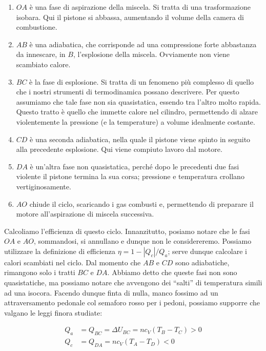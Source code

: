 \begin{enumerate}
    \item $OA$ è una fase di aspirazione della miscela. Si
    tratta di una trasformazione isobara. Qui il pistone si
    abbassa, aumentando il volume della camera di combustione.

    \item $AB$ è una adiabatica, che corrisponde ad una compressione
    forte abbastanza da innescare, in $B$, l'esplosione della
    miscela. Ovviamente non viene scambiato calore.

    \item $BC$ è la fase di esplosione. Si tratta di un fenomeno
    più complesso di quello che i nostri strumenti di termodinamica
    possano descrivere. Per questo assumiamo che tale fase non
    sia quasistatica, essendo tra l'altro molto rapida. Questo tratto
    è quello che immette calore
    nel cilindro, permettendo di alzare violentemente la pressione
    (e la temperature) a volume idealmente costante.

    \item $CD$ è una seconda adiabatica, nella quale il pistone
    viene spinto in seguito alla precedente esplosione. Qui viene
    compiuto lavoro dal motore.

    \item $DA$ è un'altra fase non quasistatica, perché dopo le
    precedenti due fasi violente il pistone termina la sua
    corsa; pressione e temperatura crollano vertiginosamente.

    \item $AO$ chiude il ciclo, scaricando i gas combusti e,
    permettendo di preparare il motore all'aspirazione di miscela
    successiva.
\end{enumerate}

Calcoliamo l'efficienza di questo ciclo. Innanzitutto, posiamo
notare che le fasi $OA$ e $AO$, sommandosi, si annullano e dunque
non le considereremo. Possiamo utilizzare la definizione di
efficienza $\eta = 1 - |Q_c|/Q_a$; serve dunque calcolare i
calori scambiati nel ciclo. Dal momento che $AB$ e $CD$ sono
adiabatiche, rimangono solo i tratti $BC$ e $DA$. Abbiamo detto
che queste fasi non sono quasistatiche, ma possiamo notare che
avvengono dei ``salti'' di temperatura simili ad una isocora.
Facendo dunque finta di nulla, manco fossimo ad un attraversamento
pedonale col semaforo rosso per i pedoni,
possiamo supporre che valgano le leggi finora studiate:

\begin{align*}
    Q_a &= Q_{BC} = \Delta U_{BC} = nc_V(T_B - T_C) > 0\\
    Q_c &= Q_{DA} = nc_V(T_A - T_D) < 0
\end{align*}

